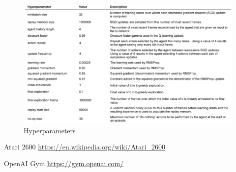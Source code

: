 \documentclass[12pt]{article}
\begin{document}
\begin{figure}[H]
\centering \includegraphics[scale=0.5]{hyperparameters.PNG}
\caption{Hyperparameters}
\label{simple1}
\end{figure}


\begin{thebibliography}{9}

  Atari 2600 \url{https://en.wikipedia.org/wiki/Atari_2600}

  OpenAI Gym \url{https://gym.openai.com/}

\end{thebibliography}
\end{document}
